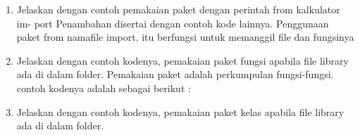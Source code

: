 \begin{enumerate}
    \item Jelaskan dengan contoh pemakaian paket dengan perintah from kalkulator im-
    port Penambahan disertai dengan contoh kode lainnya.
    Penggunaan paket from namafile import, itu berfungsi untuk memanggil file dan fungsinya
    

    \item Jelaskan dengan contoh kodenya, pemakaian paket fungsi apabila file library
    ada di dalam folder.
    Pemakaian paket adalah perkumpulan fungsi-fungsi. contoh kodenya adalah sebagai berikut :
	

    \item Jelaskan dengan contoh kodenya, pemakaian paket kelas apabila file library ada
    di dalam folder.
    
\end{enumerate}

